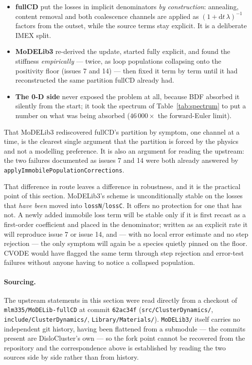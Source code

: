 \documentclass[11pt,a4paper]{article}
\newcommand{\code}[1]{\texttt{\small #1}}
\begin{document}
\begin{itemize}
\item \textbf{fullCD} put the losses in implicit denominators \emph{by
      construction}: annealing, content removal and both coalescence channels
      are applied as $(1+\mathrm dt\,\lambda)^{-1}$ factors from the outset,
      while the source terms stay explicit. It is a deliberate IMEX split.
\item \textbf{MoDELib3} re-derived the update, started fully explicit, and
      found the stiffness \emph{empirically} --- twice, as loop populations
      collapsing onto the positivity floor (issues 7 and 14) --- then fixed it
      term by term until it had reconstructed the same partition fullCD already
      had.
\item \textbf{The 0-D side} never exposed the problem at all, because BDF
      absorbed it silently from the start; it took the spectrum of
      Table~\ref{tab:spectrum} to put a number on what was being absorbed
      ($46\,000\times$ the forward-Euler limit).
\end{itemize}

That MoDELib3 rediscovered fullCD's partition by symptom, one channel at a time,
is the clearest single argument that the partition is forced by the physics and
not a modelling preference. It is also an argument for reading the upstream: the
two failures documented as issues 7 and 14 were both already answered by
\code{applyImmobilePopulationCorrections}.

That difference in route leaves a difference in robustness, and it is the
practical point of this section. MoDELib3's scheme is unconditionally stable on
the losses that \emph{have been} moved into \code{lossN}/\code{lossC}. It offers
no protection for one that has not. A newly added immobile loss term will be
stable only if it is first recast as a first-order coefficient and placed in the
denominator; written as an explicit rate it will reproduce issue 7 or issue 14,
and --- with no local error estimate and no step rejection --- the only symptom
will again be a species quietly pinned on the floor. CVODE would have flagged
the same term through step rejection and error-test failures without anyone
having to notice a collapsed population.

\paragraph{Sourcing.} The upstream statements in this section were read directly
from a checkout of \code{mlm335/MoDELib-fullCD} at commit \code{62ac34f}
(\code{src/ClusterDynamics/}, \code{include/ClusterDynamics/},
\code{Library/Materials/}). \code{MoDELib3/} itself carries no independent git
history, having been flattened from a submodule --- the commits present are
DisloCluster's own --- so the fork point cannot be recovered from the repository
and the correspondence above is established by reading the two sources side by
side rather than from history.
\end{document}
